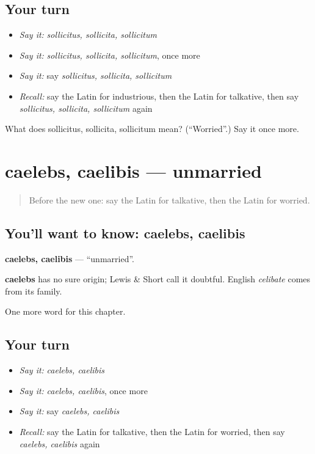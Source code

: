 \subsection*{Your turn}
\begin{itemize}
\raggedright
  \item \emph{Say it:} \emph{sollicitus, sollicita, sollicitum}
  \item \emph{Say it:} \emph{sollicitus, sollicita, sollicitum}, once more
  \item \emph{Say it:} say \emph{sollicitus, sollicita, sollicitum}
  \item \emph{Recall:} say the Latin for industrious, then the Latin for talkative, then say \emph{sollicitus, sollicita, sollicitum} again
\end{itemize}

\begin{tcolorbox}[breakable,colback=teal!4,colframe=teal!35!black,title={Before you move on}]
What does sollicitus, sollicita, sollicitum mean? (\textquotedblleft{}Worried\textquotedblright{}.) Say it once more.
\end{tcolorbox}
\section[caelebs, caelibis]{caelebs, caelibis — unmarried}

\label{lesson:LA-C241-caelebs}



\begin{quote}
Before the new one: say the Latin for talkative, then the Latin for worried.
\end{quote}

\subsection*{You'll want to know: caelebs, caelibis}
\textbf{caelebs, caelibis} — \textquotedblleft{}unmarried\textquotedblright{}.

\begin{cousinweb}
\textbf{caelebs} has no sure origin; Lewis \& Short call it doubtful. English \emph{celibate} comes from its family.
\end{cousinweb}

\begin{grammarlens}[title={What you've built}]
One more word for this chapter.
\end{grammarlens}

\subsection*{Your turn}
\begin{itemize}
\raggedright
  \item \emph{Say it:} \emph{caelebs, caelibis}
  \item \emph{Say it:} \emph{caelebs, caelibis}, once more
  \item \emph{Say it:} say \emph{caelebs, caelibis}
  \item \emph{Recall:} say the Latin for talkative, then the Latin for worried, then say \emph{caelebs, caelibis} again
\end{itemize}

